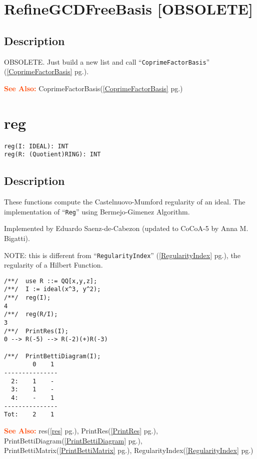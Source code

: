 \documentclass[a4paper]{mybook}
\newenvironment{command}{}{} %
\newcommand\SeeAlso{\par\textcolor{OrangeRed}{\textbf{\large See Also: }}}
\begin{document}
\section{RefineGCDFreeBasis [OBSOLETE]}
\label{RefineGCDFreeBasis [OBSOLETE]}
\begin{command} %



\subsection*{Description}

OBSOLETE.  Just build a new list and call ``\verb&CoprimeFactorBasis&'' (\ref{CoprimeFactorBasis} pg.\pageref{CoprimeFactorBasis}).

\SeeAlso %
  CoprimeFactorBasis(\ref{CoprimeFactorBasis} pg.\pageref{CoprimeFactorBasis})
\end{command} %

\section{reg}
\label{reg}
\begin{command} %


\begin{Verbatim}[label=syntax, rulecolor=\color{MidnightBlue},
frame=single]
reg(I: IDEAL): INT
reg(R: (Quotient)RING): INT
\end{Verbatim}


\subsection*{Description}

These functions compute the Castelnuovo-Mumford regularity of an ideal.
The implementation of ``\verb&Reg&'' using Bermejo-Gimenez Algorithm.
\par 
Implemented by Eduardo Saenz-de-Cabezon (updated to CoCoA-5 by Anna M. Bigatti).
\par 
NOTE: this is different from ``\verb&RegularityIndex&'' (\ref{RegularityIndex} pg.\pageref{RegularityIndex}), the regularity
of a Hilbert Function.
\begin{Verbatim}[label=example, rulecolor=\color{PineGreen}, frame=single]
/**/  use R ::= QQ[x,y,z];
/**/  I := ideal(x^3, y^2);
/**/  reg(I);
4
/**/  reg(R/I);
3
/**/  PrintRes(I);
0 --> R(-5) --> R(-2)(+)R(-3)

/**/  PrintBettiDiagram(I);
        0    1
---------------
  2:    1    -
  3:    1    -
  4:    -    1
---------------
Tot:    2    1
\end{Verbatim}


\SeeAlso %
  res(\ref{res} pg.\pageref{res}), 
    PrintRes(\ref{PrintRes} pg.\pageref{PrintRes}), 
    PrintBettiDiagram(\ref{PrintBettiDiagram} pg.\pageref{PrintBettiDiagram}), 
    PrintBettiMatrix(\ref{PrintBettiMatrix} pg.\pageref{PrintBettiMatrix}), 
    RegularityIndex(\ref{RegularityIndex} pg.\pageref{RegularityIndex})
\end{command} %
\end{document}
